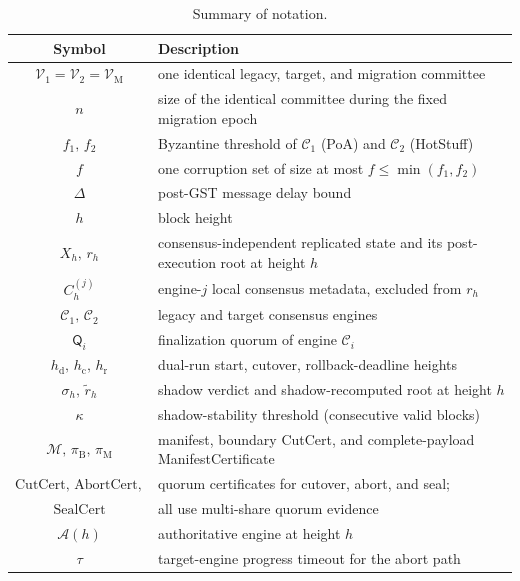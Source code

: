 \documentclass[journal]{IEEEtran}
\theoremstyle{definition}
\theoremstyle{remark}
\begin{document}
\begin{table}[t]
\centering
\caption{Summary of notation.}
\label{tab:notation}
\renewcommand{\arraystretch}{1.15}
\footnotesize
\begin{tabular}{c L{0.60\columnwidth}}
\toprule
Symbol & Description \\
\midrule
$\mathcal{V}_1=\mathcal{V}_2=\mathcal{V}_{\mathrm{M}}$ & one identical legacy, target, and migration committee \\
$n$ & size of the identical committee during the fixed migration epoch \\
$f_1,\,f_2$ & Byzantine threshold of $\mathcal{C}_1$ (PoA) and $\mathcal{C}_2$ (HotStuff) \\
$f$ & one corruption set of size at most $f\le\min(f_1,f_2)$ \\
$\Delta$ & post-GST message delay bound \\
$h$ & block height \\
$X_h,\,r_h$ & consensus-independent replicated state and its post-execution root at height $h$ \\
$C_h^{(j)}$ & engine-$j$ local consensus metadata, excluded from $r_h$ \\
$\mathcal{C}_1,\,\mathcal{C}_2$ & legacy and target consensus engines \\
$\mathsf{Q}_i$ & finalization quorum of engine $\mathcal{C}_i$ \\
$h_{\mathrm{d}},\,h_{\mathrm{c}},\,h_{\mathrm{r}}$ & dual-run start, cutover, rollback-deadline heights \\
$\sigma_h,\,\tilde r_h$ & shadow verdict and shadow-recomputed root at height $h$ \\
$\kappa$ & shadow-stability threshold (consecutive valid blocks) \\
$\mathcal{M},\,\pi_{\mathrm B},\,\pi_{\mathrm M}$ & manifest, boundary CutCert, and complete-payload ManifestCertificate \\
$\mathrm{CutCert},\,\mathrm{AbortCert},$ & quorum certificates for cutover, abort, and seal; \\
$\mathrm{SealCert}$ & all use multi-share quorum evidence \\
$\mathcal{A}(h)$ & authoritative engine at height $h$ \\
$\tau$ & target-engine progress timeout for the abort path \\
\bottomrule
\end{tabular}
\end{table}
\end{document}
